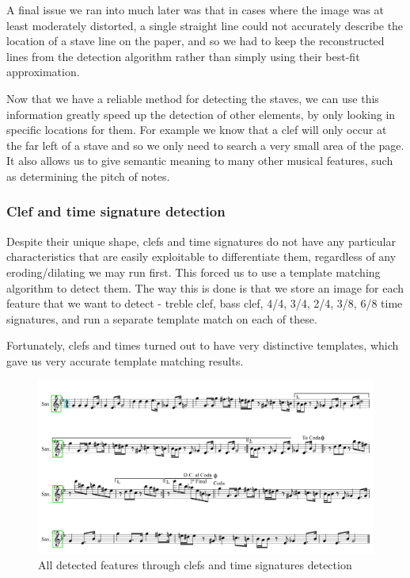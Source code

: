 A final issue we ran into much later was that in cases where the image was at least moderately distorted, a single straight line could not accurately describe the location of a stave line on the paper, and so we had to keep the reconstructed lines from the detection algorithm rather than simply using their best-fit approximation.

Now that we have a reliable method for detecting the staves, we can use this information greatly speed up the detection of other elements, by only looking in specific locations for them.  For example we know that a clef will only occur at the far left of a stave and so we only need to search a very small area of the page. It also allows us to give semantic meaning to many other musical features, such as determining the pitch of notes.

\subsubsection{Clef and time signature detection}

Despite their unique shape, clefs and time signatures do not have any particular characteristics that are easily exploitable to differentiate them, regardless of any eroding/dilating we may run first. This forced us to use a template matching algorithm to detect them. The way this is done is that we store an image for each feature that we want to detect - treble clef, bass clef, 4/4, 3/4, 2/4, 3/8, 6/8 time signatures, and run a separate
template match on each of these.

Fortunately, clefs and times turned out to have very distinctive templates, which gave us very accurate template matching results.

\begin{figure}[h!]
	\centering
	\includegraphics[width=1\textwidth]{./assets/detectedfeatures.jpg}
	\caption{All detected features through clefs and time signatures detection}
	\label{image:detectedfeatures}
\end{figure}


